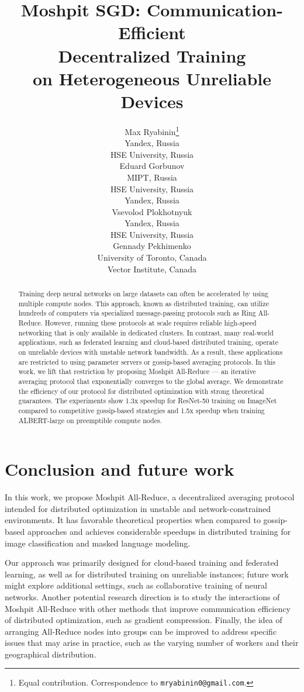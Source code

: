 \documentclass[letterpaper]{article}
\title{Moshpit SGD: Communication-Efficient\\ Decentralized Training\\ on Heterogeneous Unreliable Devices}
\author{%
  Max Ryabinin\thanks{Equal contribution. Correspondence to \texttt{mryabinin0@gmail.com}.} \\
  Yandex, Russia\\
  HSE University, Russia\\
  \And
  Eduard Gorbunov\footnotemark[1]\\
  MIPT, Russia\\
  HSE University, Russia\\
  Yandex, Russia\\
  \And
  Vsevolod Plokhotnyuk\\
  Yandex, Russia\\
  HSE University, Russia\\
  \And
  Gennady Pekhimenko\\
  University of Toronto, Canada\\
  Vector Institute, Canada
}
\begin{document}
\maketitle

\begin{abstract}
Training deep neural networks on large datasets can often be accelerated by using multiple compute nodes. 
This approach, known as distributed training, can utilize hundreds of computers via specialized message-passing protocols such as Ring All-Reduce.
However, running these protocols at scale requires reliable high-speed networking that is only available in dedicated clusters.
In contrast, many real-world applications, such as federated learning and cloud-based distributed training, operate on unreliable devices with unstable network bandwidth.
As a result, these applications are restricted to using parameter servers or gossip-based averaging protocols.
In this work, we lift that restriction by proposing Moshpit All-Reduce --- an iterative averaging protocol that exponentially converges to the global average.
We demonstrate the efficiency of our protocol for distributed optimization with strong theoretical guarantees.
The experiments show 1.3x speedup for ResNet-50 training on ImageNet compared to competitive gossip-based strategies and 1.5x speedup when training ALBERT-large on preemptible compute nodes.
\end{abstract}









\vspace{-6pt}
\section{Conclusion and future work}
\vspace{-4pt}
In this work, we propose Moshpit All-Reduce, a decentralized averaging protocol intended for distributed optimization in unstable and network-constrained environments. It has favorable theoretical properties when compared to gossip-based approaches and achieves considerable speedups in distributed training for image classification and masked language modeling.

Our approach was primarily designed for cloud-based training and federated learning, as well as for distributed training on unreliable instances; future work might explore additional settings, such as collaborative training of neural networks.
Another potential research direction is to study the interactions of Moshpit All-Reduce with other methods that improve communication efficiency of distributed optimization, such as gradient compression.
Finally, the idea of arranging All-Reduce nodes into groups can be improved to address specific issues that may arise in practice, such as the varying number of workers and their geographical distribution. 
\end{document}
